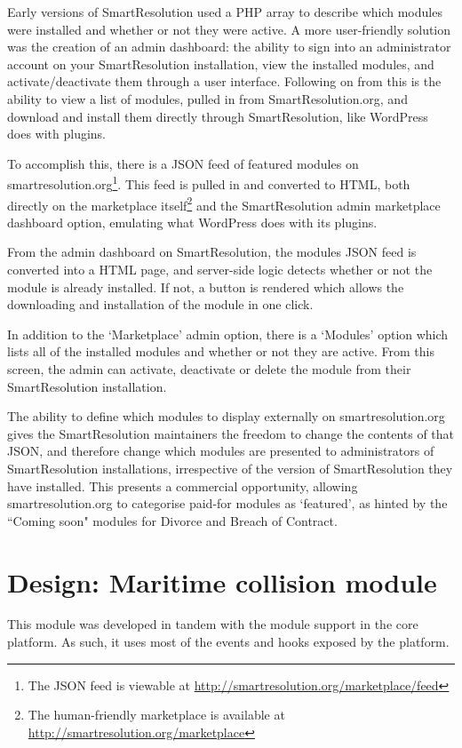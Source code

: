 Early versions of SmartResolution used a PHP array to describe which modules were installed and whether or not they were active. A more user-friendly solution was the creation of an admin dashboard: the ability to sign into an administrator account on your SmartResolution installation, view the installed modules, and activate/deactivate them through a user interface. Following on from this is the ability to view a list of modules, pulled in from SmartResolution.org, and download and install them directly through SmartResolution, like WordPress does with plugins.

To accomplish this, there is a JSON feed of featured modules on smartresolution.org\footnote{The JSON feed is viewable at \url{http://smartresolution.org/marketplace/feed}}. This feed is pulled in and converted to HTML, both directly on the marketplace itself\footnote{The human-friendly marketplace is available at \url{http://smartresolution.org/marketplace}} and the SmartResolution admin marketplace dashboard option, emulating what WordPress does with its plugins.

From the admin dashboard on SmartResolution, the modules JSON feed is converted into a HTML page, and server-side logic detects whether or not the module is already installed. If not, a button is rendered which allows the downloading and installation of the module in one click.

In addition to the `Marketplace' admin option, there is a `Modules' option which lists all of the installed modules and whether or not they are active. From this screen, the admin can activate, deactivate or delete the module from their SmartResolution installation.

The ability to define which modules to display externally on smartresolution.org gives the SmartResolution maintainers the freedom to change the contents of that JSON, and therefore change which modules are presented to administrators of SmartResolution installations, irrespective of the version of SmartResolution they have installed. This presents a commercial opportunity, allowing smartresolution.org to categorise paid-for modules as `featured', as hinted by the ``Coming soon" modules for Divorce and Breach of Contract.

\section{Design: Maritime collision module}

This module was developed in tandem with the module support in the core platform. As such, it uses most of the events and hooks exposed by the platform.

